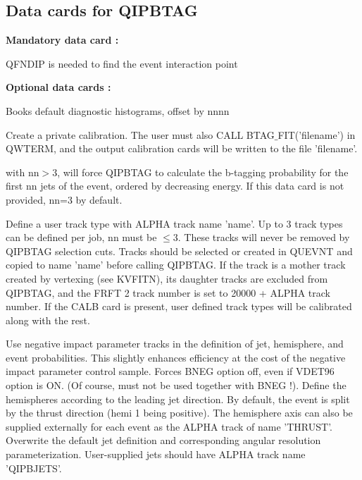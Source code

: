 \subsection{\label{sec-QIPBCD}Data cards for  QIPBTAG}
\par
{\bf Mandatory data card :}
\begin{indentlist}{ 3.50cm}{ 3.75cm}
       QFNDIP is needed to find the event interaction point
\end{indentlist}
\par
{\bf Optional data cards :}
\begin{indentlist}{ 3.50cm}{ 3.75cm}
  Books default diagnostic histograms, offset by  nnnn
 
            Create a private calibration.  The user must also
                        CALL BTAG$\_$FIT('filename') in QWTERM, and the
                        output calibration cards will be written to the file
                        'filename'.
 
 
      with nn$>3$, will force QIPBTAG to calculate the b-tagging probability for the
                          first nn jets of the event, ordered by decreasing energy.
                          If this data card is not provided, nn=3 by default.
 
     Define a user track type with ALPHA track name
'name'.
                        Up to 3 track types can be defined per job,
                  nn must be $\leq3$. These tracks will never be removed by
                        QIPBTAG selection cuts.  Tracks should be selected or
                        created in QUEVNT and copied to name 'name' before
                        calling QIPBTAG.  If the track is a mother track
                        created by vertexing (see KVFITN), its daughter
                        tracks are excluded from QIPBTAG, and the FRFT 2 track
                        number is set to 20000 + ALPHA track number.
                        If the CALB card is present, user defined track
                        types will be calibrated along with the rest.
 
   Use negative impact parameter tracks in the definition
                        of jet, hemisphere, and event probabilities.  This
                        slightly enhances efficiency at the cost of the
                        negative impact parameter control sample.
   Forces BNEG option off, even if VDET96 option is ON.   
                    (Of course, must not be used together with BNEG !).
        Define the hemispheres according to the leading
                        jet direction.  By default, the event is split
                        by the thrust direction (hemi 1 being positive).
                        The hemisphere axis can also be supplied externally
                        for each event as the ALPHA track of name 'THRUST'.
    Overwrite the default jet definition and corresponding
                        angular resolution parameterization.  User-supplied
                        jets should have ALPHA track name  'QIPBJETS'.


\end{indentlist}
